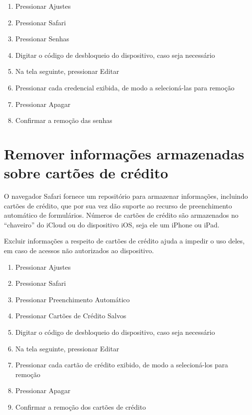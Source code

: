 \begin{enumerate}
\item Pressionar Ajustes
\item Pressionar Safari
\item Pressionar Senhas
\item Digitar o c\'odigo de desbloqueio do dispositivo, caso seja necess\'ario
\item Na tela seguinte, pressionar Editar
\item Pressionar cada credencial exibida, de modo a selecion\'a-las para remo\c c\~ao
\item Pressionar Apagar
\item Confirmar a remo\c c\~ao das senhas 
\end{enumerate}

\section{Remover informa\c c\~oes armazenadas sobre cart\~oes de cr\'edito}

O navegador Safari fornece um reposit\'orio para armazenar informa\c c\~oes, incluindo cart\~oes de cr\'edito, que por sua vez d\~ao suporte ao recurso de  preenchimento autom\'atico de formul\'arios. N\'umeros de cart\~oes de cr\'edito s\~ao armazenados no ``chaveiro'' do iCloud ou do dispositivo iOS, seja ele um iPhone ou iPad. 

Excluir informa\c c\~oes a respeito de cart\~oes de cr\'edito ajuda a impedir o uso deles, em caso de acessos n\~ao autorizados ao dispositivo.

\begin{enumerate}
\item Pressionar Ajustes
\item Pressionar Safari
\item Pressionar Preenchimento Autom\'atico
\item Pressionar Cart\~oes de Cr\'edito Salvos
\item Digitar o c\'odigo de desbloqueio do dispositivo, caso seja necess\'ario
\item Na tela seguinte, pressionar Editar
\item Pressionar cada cart\~ao de cr\'edito exibido, de modo a selecion\'a-los para remo\c c\~ao
\item Pressionar Apagar
\item Confirmar a remo\c c\~ao dos cart\~oes de cr\'edito 
\end{enumerate}	

